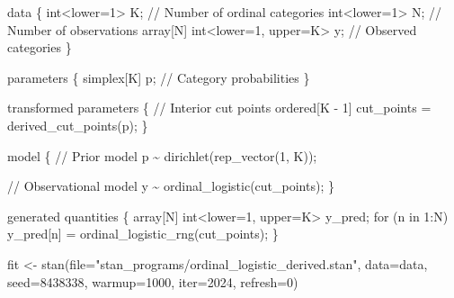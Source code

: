 \documentclass[
  letterpaper,
  DIV=11,
  numbers=noendperiod]{scrartcl}
\newenvironment{Shaded}{\begin{snugshade}}{\end{snugshade}}
\newcommand{\AttributeTok}[1]{\textcolor[rgb]{0.40,0.45,0.13}{#1}}
\newcommand{\CommentTok}[1]{\textcolor[rgb]{0.37,0.37,0.37}{#1}}
\newcommand{\ControlFlowTok}[1]{\textcolor[rgb]{0.00,0.23,0.31}{#1}}
\newcommand{\DataTypeTok}[1]{\textcolor[rgb]{0.68,0.00,0.00}{#1}}
\newcommand{\DecValTok}[1]{\textcolor[rgb]{0.68,0.00,0.00}{#1}}
\newcommand{\FunctionTok}[1]{\textcolor[rgb]{0.28,0.35,0.67}{#1}}
\newcommand{\KeywordTok}[1]{\textcolor[rgb]{0.00,0.23,0.31}{#1}}
\newcommand{\NormalTok}[1]{\textcolor[rgb]{0.00,0.23,0.31}{#1}}
\newcommand{\OtherTok}[1]{\textcolor[rgb]{0.00,0.23,0.31}{#1}}
\newcommand{\StringTok}[1]{\textcolor[rgb]{0.13,0.47,0.30}{#1}}
\begin{document}
\begin{codelisting}
\begin{Shaded}
\begin{Highlighting}[]
\KeywordTok{data}\NormalTok{ \{}
  \DataTypeTok{int}\NormalTok{\textless{}}\KeywordTok{lower}\NormalTok{=}\DecValTok{1}\NormalTok{\textgreater{} K;                   }\CommentTok{// Number of ordinal categories}
  \DataTypeTok{int}\NormalTok{\textless{}}\KeywordTok{lower}\NormalTok{=}\DecValTok{1}\NormalTok{\textgreater{} N;                   }\CommentTok{// Number of observations}
  \DataTypeTok{array}\NormalTok{[N] }\DataTypeTok{int}\NormalTok{\textless{}}\KeywordTok{lower}\NormalTok{=}\DecValTok{1}\NormalTok{, }\KeywordTok{upper}\NormalTok{=K\textgreater{} y; }\CommentTok{// Observed categories}
\NormalTok{\}}

\KeywordTok{parameters}\NormalTok{ \{}
  \DataTypeTok{simplex}\NormalTok{[K] p; }\CommentTok{// Category probabilities}
\NormalTok{\}}

\KeywordTok{transformed parameters}\NormalTok{ \{}
  \CommentTok{// Interior cut points}
  \DataTypeTok{ordered}\NormalTok{[K {-} }\DecValTok{1}\NormalTok{] cut\_points = derived\_cut\_points(p);}
\NormalTok{\}}

\KeywordTok{model}\NormalTok{ \{}
  \CommentTok{// Prior model}
\NormalTok{  p \textasciitilde{} dirichlet(rep\_vector(}\DecValTok{1}\NormalTok{, K));}

  \CommentTok{// Observational model}
\NormalTok{  y \textasciitilde{} ordinal\_logistic(cut\_points);}
\NormalTok{\}}

\KeywordTok{generated quantities}\NormalTok{ \{}
  \DataTypeTok{array}\NormalTok{[N] }\DataTypeTok{int}\NormalTok{\textless{}}\KeywordTok{lower}\NormalTok{=}\DecValTok{1}\NormalTok{, }\KeywordTok{upper}\NormalTok{=K\textgreater{} y\_pred;}
  \ControlFlowTok{for}\NormalTok{ (n }\ControlFlowTok{in} \DecValTok{1}\NormalTok{:N)}
\NormalTok{    y\_pred[n] = ordinal\_logistic\_rng(cut\_points);}
\NormalTok{\}}
\end{Highlighting}
\end{Shaded}

\end{codelisting}

\begin{Shaded}
\begin{Highlighting}[]
\NormalTok{fit }\OtherTok{\textless{}{-}} \FunctionTok{stan}\NormalTok{(}\AttributeTok{file=}\StringTok{"stan\_programs/ordinal\_logistic\_derived.stan"}\NormalTok{,}
            \AttributeTok{data=}\NormalTok{data, }\AttributeTok{seed=}\DecValTok{8438338}\NormalTok{,}
            \AttributeTok{warmup=}\DecValTok{1000}\NormalTok{, }\AttributeTok{iter=}\DecValTok{2024}\NormalTok{, }\AttributeTok{refresh=}\DecValTok{0}\NormalTok{)}
\end{Highlighting}
\end{Shaded}
\end{document}
